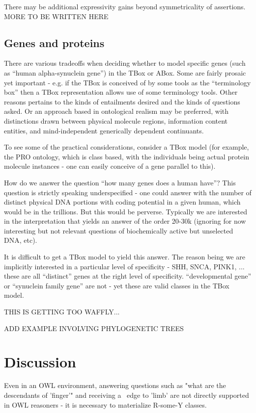 \documentclass{my}
\def\partOf{\pr{part\_of}}
\begin{document}
There may be additional expressivity gains beyond symmetricality of
assertions. MORE TO BE WRITTEN HERE

\subsection{Genes and proteins}

There are various tradeoffs when deciding whether to model specific
genes (such as ``human alpha-synuclein gene'') in the TBox or
ABox. Some are fairly prosaic yet important - e.g. if the TBox is
conceived of by some tools as the ``terminology box'' then a TBox
representation allows use of some terminology tools. Other reasons
pertains to the kinds of entailments desired and the kinds of
questions asked. Or an approach based in ontological realism may be
preferred, with distinctions drawn between physical molecule regions,
information content entities, and mind-independent generically
dependent continuants.

To see some of the practical considerations, consider a TBox model
(for example, the PRO ontology, which is class based, with the
individuals being actual protein molecule instances - one can easily
conceive of a gene parallel to this).

How do we answer the question ``how many genes does a human have''?
This question is strictly speaking underspecified - one could answer
with the number of distinct physical DNA portions with coding
potential in a given human, which would be in the trillions. But this
would be perverse. Typically we are interested in the interpretation
that yields an answer of the order 20-30k (ignoring for now
interesting but not relevant questions of biochemically active but
unselected DNA, etc).

It is difficult to get a TBox model to yield this answer. The reason
being we are implicitly interested in a particular level of
specificity - SHH, SNCA, PINK1, ... these are all ``distinct'' genes
at the right level of specificity. ``developmental gene'' or
``synuclein family gene'' are not - yet these are valid classes in the
TBox model.

THIS IS GETTING TOO WAFFLY...

ADD EXAMPLE INVOLVING PHYLOGENETIC TREES

\section{Discussion}

Even in an OWL environment, answering questions such as "what are the descendants of 'finger'" and
receiving a \partOf\ edge to 'limb' are not directly supported in OWL reasoners - it is necessary to
materialize R-some-Y classes.
\end{document}

